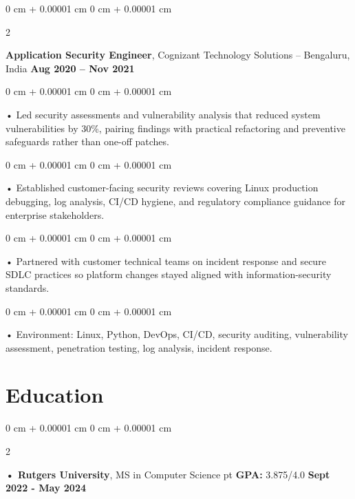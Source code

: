 \documentclass[10pt, letterpaper]{article}
\newenvironment{onecolentry}{
    \begin{adjustwidth}{
        0 cm + 0.00001 cm
    }{
        0 cm + 0.00001 cm
    }
}{
    \end{adjustwidth}
} %
\newenvironment{twocolentry}[2][]{
    \onecolentry
    \def\secondColumn{#2}
    \setcolumnwidth{\fill, 4.5 cm}
    \begin{paracol}{2}
}{
    \switchcolumn \raggedleft \secondColumn
    \end{paracol}
    \endonecolentry
} %
\begin{document}
        \begin{twocolentry}{
            \textbf{Aug 2020 – Nov 2021}
        }
            \vspace{2 pt }
            \textbf{Application Security Engineer}, Cognizant Technology Solutions -- Bengaluru, India\end{twocolentry}
        \begin{onecolentry}
             • Led security assessments and vulnerability analysis that reduced system vulnerabilities by 30\%, pairing findings with practical refactoring and preventive safeguards rather than one-off patches.
        \end{onecolentry}
        \begin{onecolentry}
             • Established customer-facing security reviews covering Linux production debugging, log analysis, CI/CD hygiene, and regulatory compliance guidance for enterprise stakeholders.
        \end{onecolentry}
        \begin{onecolentry}
             • Partnered with customer technical teams on incident response and secure SDLC practices so platform changes stayed aligned with information-security standards.
        \end{onecolentry}
        \begin{onecolentry}
             • Environment: Linux, Python, DevOps, CI/CD, security auditing, vulnerability assessment, penetration testing, log analysis, incident response.
        \end{onecolentry}
    \vspace{2 pt }
        \section{Education}
        \vspace{2 pt }
        \begin{twocolentry}{
            \textbf{Sept 2022 - May 2024}
        }
            \textbf{ • Rutgers University}, MS in Computer Science  pt \textbf{GPA:} 3.875/4.0  \end{twocolentry}
\end{document}
